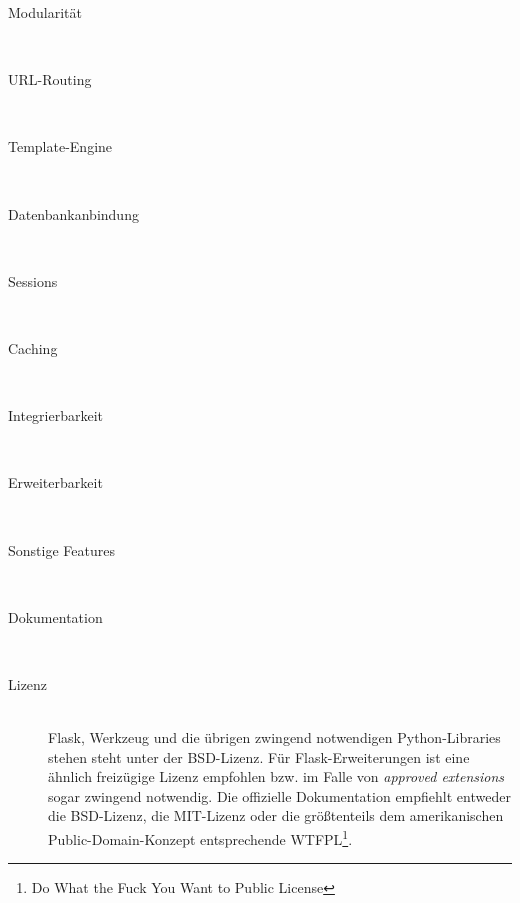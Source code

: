 \begin{description}
\item[Modularität] \hfill \\


\item[URL-Routing] \hfill \\


\item[Template-Engine] \hfill \\


\item[Datenbankanbindung] \hfill \\


\item[Sessions] \hfill \\


\item[Caching] \hfill \\


\item[Integrierbarkeit] \hfill \\


\item[Erweiterbarkeit] \hfill \\


\item[Sonstige Features] \hfill \\


\item[Dokumentation] \hfill \\


\item[Lizenz] \hfill \\
Flask, Werkzeug und die übrigen zwingend notwendigen Python-Libraries stehen steht unter der
BSD-Lizenz. Für Flask-Erweiterungen ist eine ähnlich freizügige Lizenz empfohlen bzw. im Falle von
\emph{approved extensions} sogar zwingend notwendig. Die offizielle Dokumentation empfiehlt entweder
die BSD-Lizenz, die MIT-Lizenz oder die größtenteils dem amerikanischen Public-Domain-Konzept
entsprechende WTFPL\footnote{Do What the Fuck You Want to Public License}.
\end{description}
